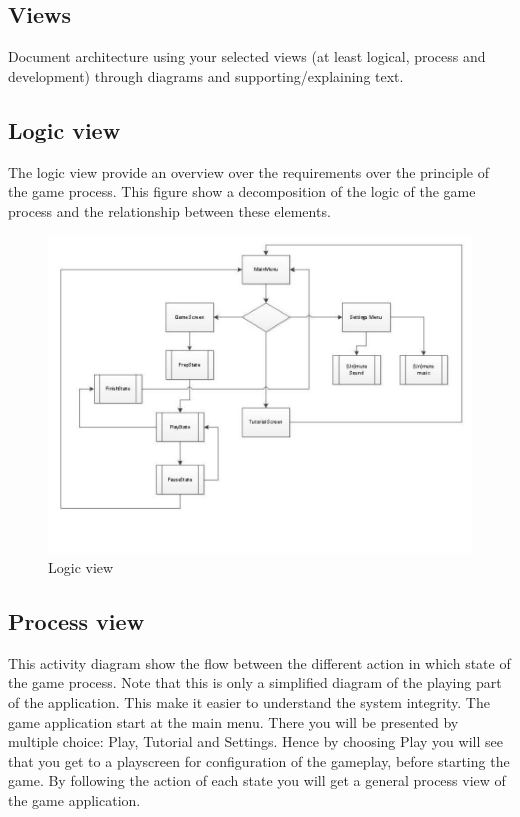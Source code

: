 \subsection{Views}

Document architecture using your selected views (at least logical, process and development) through diagrams and supporting/explaining text.	

\subsection{Logic view} 
The logic view provide an overview over the requirements over the principle of the game process. This figure show a decomposition of the logic of the game process and the relationship between these elements.

\begin{figure}[ht!]
	\centering
	\includegraphics[width=150mm]{viewpoint.jpg}
	\caption{Logic view}
	\label{fig:view}
\end{figure}

\newpage
\subsection{Process view}
This activity diagram show the flow between the different action in which state of the game process. Note that this is only a simplified diagram of the playing part of the application. This make it easier to understand the system integrity. The game application start at the main menu. There you will be presented by multiple choice: Play, Tutorial and Settings. Hence by choosing Play you will see that you get to a playscreen for configuration of the gameplay, before starting the game. By following the action of each state you will get a general process view of the game application.


